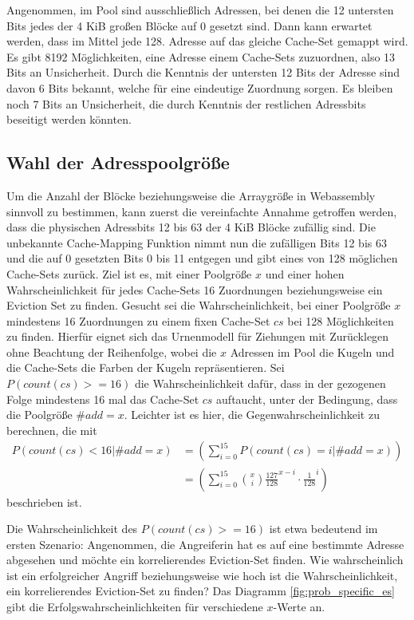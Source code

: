 Angenommen, im Pool sind ausschließlich Adressen, bei denen die 12 untersten Bits jedes der 4 KiB großen Blöcke auf 0 gesetzt sind. Dann kann erwartet werden, dass im Mittel jede 128. 
Adresse auf das gleiche Cache-Set gemappt wird. Es gibt 8192 Möglichkeiten, eine Adresse einem Cache-Sets zuzuordnen, also 13 Bits an Unsicherheit.
Durch die Kenntnis der untersten 12 Bits der Adresse sind davon 6 Bits bekannt, welche für eine eindeutige Zuordnung sorgen. 
Es bleiben noch 7 Bits an Unsicherheit, die durch Kenntnis der restlichen Adressbits beseitigt werden könnten.

\subsection{Wahl der Adresspoolgröße}

Um die Anzahl der Blöcke beziehungsweise die Arraygröße in Webassembly sinnvoll zu bestimmen, kann zuerst die vereinfachte Annahme getroffen werden, dass die physischen Adressbits 12 bis 63 der 4 KiB Blöcke zufällig sind. 
Die unbekannte Cache-Mapping Funktion nimmt nun die zufälligen Bits 12 bis 63 und die auf 0 gesetzten Bits 0 bis 11 entgegen und gibt eines von 128 möglichen Cache-Sets zurück.
Ziel ist es, mit einer Poolgröße $x$ und einer hohen Wahrscheinlichkeit für jedes Cache-Sets 16 Zuordnungen beziehungsweise ein Eviction Set zu finden.
Gesucht sei die Wahrscheinlichkeit, bei einer Poolgröße $x$ mindestens 16 Zuordnungen zu einem fixen Cache-Set $cs$ bei 128 Möglichkeiten zu finden.
Hierfür eignet sich das Urnenmodell für Ziehungen mit Zurücklegen ohne Beachtung der Reihenfolge, wobei die $x$ Adressen im Pool die Kugeln und die Cache-Sets die Farben der Kugeln repräsentieren. Sei $P(count(cs)>=16)$ die Wahrscheinlichkeit dafür, dass in der gezogenen Folge mindestens 16 mal das Cache-Set $cs$ auftaucht, unter der Bedingung, dass die Poolgröße $\#add = x$.
Leichter ist es hier, die Gegenwahrscheinlichkeit zu berechnen, die mit
\begin{align*}
P(count(cs)<16|\#add = x) &=
\left( \sum\limits_{i=0}^{15}P(count(cs)=i|\#add = x) \right) \\&=
\left( \sum\limits_{i=0}^{15} {x \choose i} \frac{127}{128}^{x-i} \cdot \frac{1}{128}^i  \right)
\end{align*}
beschrieben ist.

Die Wahrscheinlichkeit des $P(count(cs)>=16)$ ist etwa bedeutend im ersten Szenario:
Angenommen, die Angreiferin hat es auf eine bestimmte Adresse abgesehen und möchte ein korrelierendes Eviction-Set finden. 
Wie wahrscheinlich ist ein erfolgreicher Angriff beziehungsweise wie hoch ist die Wahrscheinlichkeit, ein korrelierendes Eviction-Set zu finden? 
Das Diagramm \ref{fig:prob_specific_es} gibt die Erfolgswahrscheinlichkeiten für verschiedene $x$-Werte an. 

